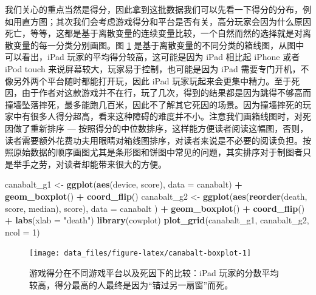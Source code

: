 \documentclass[
  b5paper,
  UTF8,twoside]{book}
\newenvironment{Shaded}{\begin{snugshade}}{\end{snugshade}}
\newcommand{\AttributeTok}[1]{\textcolor[rgb]{0.13,0.29,0.53}{#1}}
\newcommand{\DecValTok}[1]{\textcolor[rgb]{0.00,0.00,0.81}{#1}}
\newcommand{\FunctionTok}[1]{\textcolor[rgb]{0.13,0.29,0.53}{\textbf{#1}}}
\newcommand{\NormalTok}[1]{#1}
\newcommand{\OtherTok}[1]{\textcolor[rgb]{0.56,0.35,0.01}{#1}}
\newcommand{\SpecialCharTok}[1]{\textcolor[rgb]{0.81,0.36,0.00}{\textbf{#1}}}
\newcommand{\StringTok}[1]{\textcolor[rgb]{0.31,0.60,0.02}{#1}}
\begin{document}
我们关心的重点当然是得分，因此拿到这批数据我们可以先看一下得分的分布，例如用直方图；其次我们会考虑游戏得分和平台是否有关，高分玩家会因为什么原因死亡，等等，这都是基于离散变量的连续变量比较，一个自然而然的选择就是对离散变量的每一分类分别画图。图 \ref{fig:canabalt-boxplot} 是基于离散变量的不同分类的箱线图，从图中可以看出，iPad 玩家的平均得分较高，这可能是因为 iPad 相比起 iPhone 或者 iPod touch 来说屏幕较大，玩家易于控制，也可能是因为 iPad 需要专门开机，不像另外两个平台随时都能打开玩，因此 iPad 玩家玩起来会更集中精力。至于死因，由于作者对这款游戏并不在行，玩了几次，得到的结果都是因为跳得不够高而撞墙坠落摔死，最多能跑几百米，因此不了解其它死因的场景。因为撞墙摔死的玩家中有很多人得分超高，看来这种障碍的难度并不小。注意我们画箱线图时，对死因做了重新排序 --- 按照得分的中位数排序，这样能方便读者阅读这幅图，否则，读者需要额外花费功夫用眼睛对箱线图排序，对读者来说是不必要的阅读负担。按照原始数据的顺序画图尤其是条形图和饼图中常见的问题，其实排序对于制图者只是举手之劳，对读者却能带来很大的方便。

\begin{Shaded}
\begin{Highlighting}[]
\NormalTok{canabalt\_g1 }\OtherTok{\textless{}{-}} \FunctionTok{ggplot}\NormalTok{(}\FunctionTok{aes}\NormalTok{(device, score), }\AttributeTok{data =}\NormalTok{ canabalt) }\SpecialCharTok{+}
  \FunctionTok{geom\_boxplot}\NormalTok{() }\SpecialCharTok{+}
  \FunctionTok{coord\_flip}\NormalTok{()}
\NormalTok{canabalt\_g2 }\OtherTok{\textless{}{-}} \FunctionTok{ggplot}\NormalTok{(}\FunctionTok{aes}\NormalTok{(}\FunctionTok{reorder}\NormalTok{(death, score, median), score),}
  \AttributeTok{data =}\NormalTok{ canabalt}
\NormalTok{) }\SpecialCharTok{+}
  \FunctionTok{geom\_boxplot}\NormalTok{() }\SpecialCharTok{+}
  \FunctionTok{coord\_flip}\NormalTok{() }\SpecialCharTok{+}
  \FunctionTok{labs}\NormalTok{(}\AttributeTok{xlab =} \StringTok{"death"}\NormalTok{)}
\FunctionTok{library}\NormalTok{(cowplot)}
\FunctionTok{plot\_grid}\NormalTok{(canabalt\_g1, canabalt\_g2, }\AttributeTok{ncol =} \DecValTok{1}\NormalTok{)}
\end{Highlighting}
\end{Shaded}

\begin{figure}

{\centering \texttt{[image: data\_files/figure-latex/canabalt-boxplot-1]} 

}

\caption[游戏得分在不同游戏平台以及死因下的比较]{游戏得分在不同游戏平台以及死因下的比较：iPad 玩家的分数平均较高，得分最高的人最终是因为``错过另一扇窗''而死。}\label{fig:canabalt-boxplot}
\end{figure}
\end{document}

